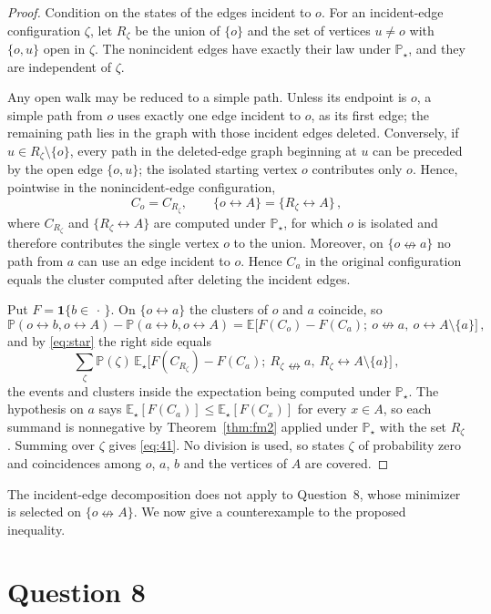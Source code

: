 \documentclass[11pt]{article}
\theoremstyle{definition}
\theoremstyle{remark}
\newcommand{\PP}{\mathbb P}
\newcommand{\EE}{\mathbb E}
\newcommand{\one}{\mathbf 1}
\newcommand{\con}{\leftrightarrow}
\newcommand{\ncon}{\nleftrightarrow}
\begin{document}
\begin{proof}
Condition on the states of the edges incident to $o$. For an incident-edge configuration
$\zeta$, let
$R_\zeta$ be the union of $\{o\}$ and the set of vertices $u\neq o$ with $\{o,u\}$ open in
$\zeta$. The nonincident edges have exactly their law under $\PP_\star$, and they
are independent of $\zeta$.

Any open walk may be reduced to a simple path. Unless its endpoint is $o$, a simple path
from $o$ uses exactly one edge incident to $o$, as its first edge; the remaining path lies
in the graph with those incident edges deleted. Conversely, if
$u\in R_\zeta\setminus\{o\}$, every path in the deleted-edge graph beginning at $u$ can be
preceded by the open edge $\{o,u\}$; the isolated starting vertex $o$ contributes only
$o$. Hence, pointwise in the nonincident-edge configuration,
\begin{equation}\label{eq:star}
 C_o=C_{R_\zeta},\qquad \{o\con A\}=\{R_\zeta\con A\}\,,
\end{equation}
where $C_{R_\zeta}$ and $\{R_\zeta\con A\}$ are computed under $\PP_\star$, for which $o$ is isolated and therefore
contributes the single vertex $o$ to the union. Moreover, on $\{o\ncon a\}$ no path from
$a$ can use an edge incident to $o$. Hence $C_a$ in the original configuration equals the
cluster computed after deleting the incident edges.

Put $F=\one\{b\in\,\cdot\,\}$. On $\{o\con a\}$ the clusters of $o$ and $a$ coincide, so
\[
 \PP(o\con b,o\con A)-\PP(a\con b,o\con A)
 =\EE\bigl[F(C_o)-F(C_a);\ o\ncon a,\ o\con A\setminus\{a\}\bigr]\,,
\]
and by \eqref{eq:star} the right side equals
\[
 \sum_{\zeta}\PP(\zeta)\,\EE_\star\bigl[F(C_{R_\zeta})-F(C_a);\ R_\zeta\ncon a,\
 R_\zeta\con A\setminus\{a\}\bigr]\,,
\]
the events and clusters inside the expectation being computed under $\PP_\star$. The
hypothesis on $a$ says $\EE_\star[F(C_a)]\le\EE_\star[F(C_x)]$ for every $x\in A$, so each
summand is nonnegative by Theorem~\ref{thm:fm2} applied under $\PP_\star$ with the set
$R_\zeta$. Summing over $\zeta$ gives \eqref{eq:41}. No division is used, so states $\zeta$ of
probability zero and coincidences among $o$, $a$, $b$ and the vertices of $A$ are covered.
\end{proof}

The incident-edge decomposition does not apply to Question~8, whose minimizer is selected
on $\{o\ncon A\}$. We now give a counterexample to the proposed inequality.

\section{Question 8}\label{sec:q8}
\end{document}

